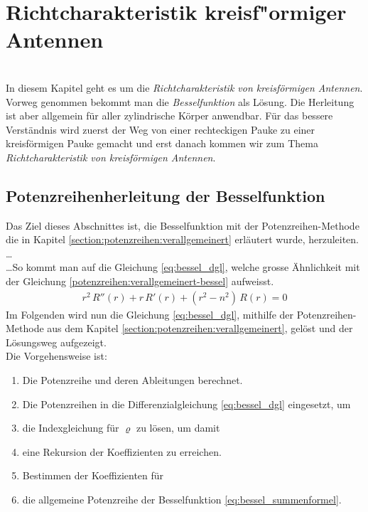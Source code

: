 \chapter{Richtcharakteristik kreisf"ormiger Antennen\label{chapter:kreis}}
\begin{refsection}
\\
%
%
%
In diesem Kapitel geht es um die \emph{Richtcharakteristik von kreisf\"ormigen Antennen}.
Vorweg genommen bekommt man die \emph{Besselfunktion} als L\"osung.
Die Herleitung ist aber allgemein f\"ur aller zylindrische K\"orper anwendbar.
F\"ur das bessere Verst\"andnis wird zuerst der Weg von einer rechteckigen Pauke zu einer kreisf\"ormigen Pauke gemacht und erst danach kommen wir zum Thema \emph{Richtcharakteristik von kreisf\"ormigen Antennen}.
%
%
%
\section{Potenzreihenherleitung der Besselfunktion}
Das Ziel dieses Abschnittes ist, die Besselfunktion mit der Potenzreihen-Methode die in Kapitel \ref{section:potenzreihen:verallgemeinert} erl\"autert wurde, herzuleiten.
\dots \\
%
\dots So kommt man auf die Gleichung \ref{eq:bessel_dgl}, welche grosse \"Ahnlichkeit mit der Gleichung \ref{potenzreihen:verallgemeinert-bessel} aufweisst.
\begin{align}
	r^2 \, R'' \left( r \right)
	+
	r \, R' \left( r \right)
	+
	\left( r^2 - n^2 \right) \, R \left( r \right)
	=
	0
	\label{eq:bessel_dgl}
\end{align}
Im Folgenden wird nun die Gleichung \ref{eq:bessel_dgl}, mithilfe der Potenzreihen-Methode aus dem Kapitel \ref{section:potenzreihen:verallgemeinert}, gel\"ost und der L\"osungsweg aufgezeigt.
\\
Die Vorgehensweise ist:
\begin{enumerate}
	\item Die Potenzreihe und deren Ableitungen berechnet.
	\item Die Potenzreihen in die Differenzialgleichung \ref{eq:bessel_dgl} eingesetzt, um
	\item die Indexgleichung f\"ur $\varrho$ zu l\"osen, um damit
	\item eine Rekursion der Koeffizienten zu erreichen.
	\item Bestimmen der Koeffizienten f\"ur
	\item die allgemeine Potenzreihe der Besselfunktion \ref{eq:bessel_summenformel}.
\end{enumerate}


\end{refsection}
